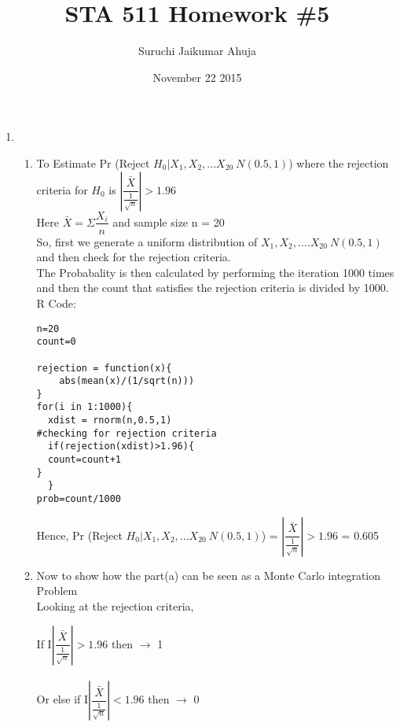\documentclass[11pt]{article}
\begin{document}
\title{STA 511 Homework \#5}
\date{November 22 2015}
\author{Suruchi Jaikumar Ahuja}
\maketitle

\begin{enumerate}

\item 
\begin{enumerate}
\item To Estimate Pr (Reject $H_{0}|X_{1},X_{2},...X_{20}~ N(0.5,1)$) where the rejection criteria for ${H_0}$ is $|{\dfrac{\bar {X}}{\frac{1}{\sqrt{n}}}}| > 1.96 $\\
Here $\bar{X} = \Sigma \dfrac{X_i}{n}$ and sample size n = 20\\

So, first we generate a uniform distribution of $X_{1},X_{2},....X_{20} ~ N(0.5,1)$ and then check for the rejection criteria.\\
The Probabality is then calculated by performing the iteration 1000 times and then the count that satisfies the rejection criteria is divided by 1000.\\

R Code:\\
\begin{verbatim}
n=20
count=0

rejection = function(x){
    abs(mean(x)/(1/sqrt(n)))
}
for(i in 1:1000){
  xdist = rnorm(n,0.5,1)
#checking for rejection criteria
  if(rejection(xdist)>1.96){
  count=count+1
}
  }
prob=count/1000
\end{verbatim}

Hence, Pr (Reject $H_{0}|X_{1},X_{2},...X_{20}~ N(0.5,1)$) = $|{\dfrac{\bar {X}}{\frac{1}{\sqrt{n}}}}| > 1.96 $ = 0.605\\

\item
Now to show how the part(a) can be seen as a Monte Carlo integration Problem\\

Looking at the rejection criteria,

If I$|{\dfrac{\bar {X}}{\frac{1}{\sqrt{n}}}}| > 1.96 $ then $\rightarrow$ 1\\\\
Or else if I$|{\dfrac{\bar {X}}{\frac{1}{\sqrt{n}}}}| < 1.96 $ then $\rightarrow$ 0\\\\



\end{enumerate}
\end{enumerate}
\end{document}
